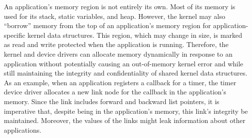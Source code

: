 An application's memory region is not entirely its own. Most of its memory is
used for its stack, static variables, and heap. However,
the kernel may also ``borrow'' memory from the top of an application's memory
region for application-specific kernel data structures. This region, which may
change in size,
is marked
as read and write protected when the application is running. Therefore, the
kernel and device drivers can allocate memory dynamically in response to an
application without
potentially causing an out-of-memory kernel error and while still
maintaining the integrity and
confidentiality of shared kernel data structures. As an example, when an
application registers a callback for a timer, the timer device driver
allocates a new link node for the callback in the application's memory.
Since the link includes forward and backward list
pointers, it is imperative that, despite being in the application's memory,
this link's integrity be maintained. Moreover, the values of the links might
leak information about other applications.

